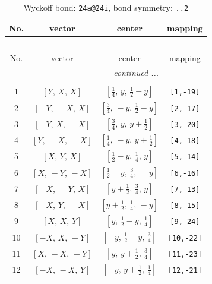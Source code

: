 \documentclass[fleqn,8pt]{jsarticle}
\begin{document}
\begin{longtable}{cccc}
\caption{Wyckoff bond: {\tt 24a@24i}, bond symmetry: {\tt ..2}}
 \\
 \hline \hline
No. & vector & center & mapping \\ \hline \endfirsthead

\multicolumn{3}{l}{\tablename\ \thetable{}} \\
 \hline \hline
No. & vector & center & mapping \\ \hline \endhead

 \hline \hline
\multicolumn{3}{r}{\footnotesize\it continued ...} \\ \endfoot

 \hline \hline
\multicolumn{3}{r}{} \\ \endlastfoot

1 & $\left[ Y,\, X,\, X \right]$ & $\left[ \frac{1}{4},\, y,\, \frac{1}{2} - y \right]$ & {\tt [1,-19]} \\ \hline
2 & $\left[ - Y,\, - X,\, X \right]$ & $\left[ \frac{3}{4},\, - y,\, \frac{1}{2} - y \right]$ & {\tt [2,-17]} \\ \hline
3 & $\left[ - Y,\, X,\, - X \right]$ & $\left[ \frac{3}{4},\, y,\, y + \frac{1}{2} \right]$ & {\tt [3,-20]} \\ \hline
4 & $\left[ Y,\, - X,\, - X \right]$ & $\left[ \frac{1}{4},\, - y,\, y + \frac{1}{2} \right]$ & {\tt [4,-18]} \\ \hline
5 & $\left[ X,\, Y,\, X \right]$ & $\left[ \frac{1}{2} - y,\, \frac{1}{4},\, y \right]$ & {\tt [5,-14]} \\ \hline
6 & $\left[ X,\, - Y,\, - X \right]$ & $\left[ \frac{1}{2} - y,\, \frac{3}{4},\, - y \right]$ & {\tt [6,-16]} \\ \hline
7 & $\left[ - X,\, - Y,\, X \right]$ & $\left[ y + \frac{1}{2},\, \frac{3}{4},\, y \right]$ & {\tt [7,-13]} \\ \hline
8 & $\left[ - X,\, Y,\, - X \right]$ & $\left[ y + \frac{1}{2},\, \frac{1}{4},\, - y \right]$ & {\tt [8,-15]} \\ \hline
9 & $\left[ X,\, X,\, Y \right]$ & $\left[ y,\, \frac{1}{2} - y,\, \frac{1}{4} \right]$ & {\tt [9,-24]} \\ \hline
10 & $\left[ - X,\, X,\, - Y \right]$ & $\left[ - y,\, \frac{1}{2} - y,\, \frac{3}{4} \right]$ & {\tt [10,-22]} \\ \hline
11 & $\left[ X,\, - X,\, - Y \right]$ & $\left[ y,\, y + \frac{1}{2},\, \frac{3}{4} \right]$ & {\tt [11,-23]} \\ \hline
12 & $\left[ - X,\, - X,\, Y \right]$ & $\left[ - y,\, y + \frac{1}{2},\, \frac{1}{4} \right]$ & {\tt [12,-21]} \\
\end{longtable}
\end{document}
